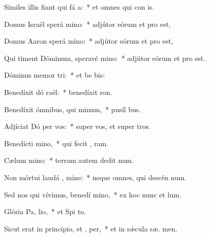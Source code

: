\item Símiles illis fiant qui fá a:~* et omnes qui con  is.
\item Domus Israël sperá  mino:~* adjútor eórum et pro  est,
\item Domus Aaron sperá  mino:~* adjútor eórum et pro  est,
\item Qui timent Dóminum, speravé  mino:~* adjútor eórum et pro  est.
\item Dóminus memor  tri:~* et be bis:
\item Benedíxit dó raël:~* benedíxit  ron.
\item Benedíxit ómnibus, qui  minum,~* pusíl  bus.
\item Adjíciat Dó per vos:~* super vos, et super  tros.
\item Benedícti   mino,~* qui fecit ,  ram.
\item Cælum  mino:~* terram autem dedit  num.
\item Non mórtui laudá , mine:~* neque omnes, qui descén  num.
\item Sed nos qui vívimus, benedí mino,~* ex hoc nunc et   lum.
\item Glória Pa,  lio,~* et Spi to.
\item Sicut erat in princípio, et ,  per,~* et in sǽcula sæ. men.
